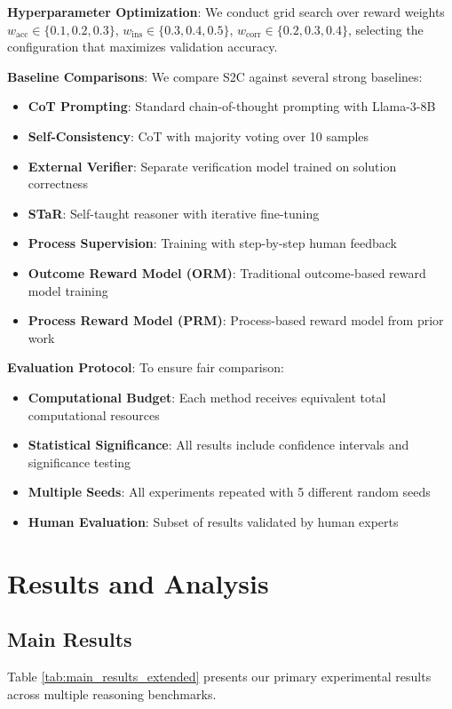\documentclass[10pt,twocolumn]{article}
\newcommand{\ssc}{\textsc{S2C}}
\begin{document}
\textbf{Hyperparameter Optimization}: We conduct grid search over reward weights $w_{\text{acc}} \in \{0.1, 0.2, 0.3\}$, $w_{\text{ins}} \in \{0.3, 0.4, 0.5\}$, $w_{\text{corr}} \in \{0.2, 0.3, 0.4\}$, selecting the configuration that maximizes validation accuracy.

\textbf{Baseline Comparisons}: We compare \ssc{} against several strong baselines:
\begin{itemize}
\item \textbf{CoT Prompting}: Standard chain-of-thought prompting with Llama-3-8B
\item \textbf{Self-Consistency}: CoT with majority voting over 10 samples
\item \textbf{External Verifier}: Separate verification model trained on solution correctness
\item \textbf{STaR}: Self-taught reasoner with iterative fine-tuning
\item \textbf{Process Supervision}: Training with step-by-step human feedback
\item \textbf{Outcome Reward Model (ORM)}: Traditional outcome-based reward model training
\item \textbf{Process Reward Model (PRM)}: Process-based reward model from prior work
\end{itemize}

\textbf{Evaluation Protocol}: To ensure fair comparison:
\begin{itemize}
\item \textbf{Computational Budget}: Each method receives equivalent total computational resources
\item \textbf{Statistical Significance}: All results include confidence intervals and significance testing
\item \textbf{Multiple Seeds}: All experiments repeated with 5 different random seeds
\item \textbf{Human Evaluation}: Subset of results validated by human experts
\end{itemize}

\section{Results and Analysis}

\subsection{Main Results}

Table \ref{tab:main_results_extended} presents our primary experimental results across multiple reasoning benchmarks.
\end{document}
